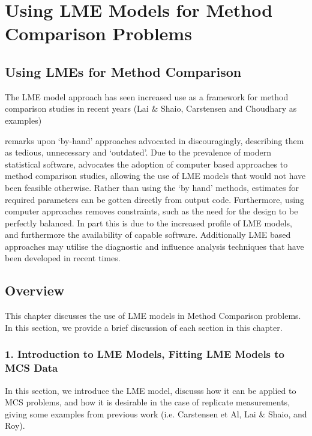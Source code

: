 \documentclass[Main.tex]{subfiles}
\begin{document}
\setcounter{tocdepth}{1}
\tableofcontents
\chapter{Using LME Models for Method Comparison Problems}

\newpage
\section{Using LMEs for Method Comparison}
The LME model approach has seen increased use as a framework for method comparison studies in recent years (Lai $\&$ Shaio, Carstensen and Choudhary as examples)

\citet{BXC2008} remarks upon `by-hand' approaches advocated in \citet{BA99} discouragingly, describing them as tedious, unnecessary and `outdated'. Due to the prevalence of modern statistical software, \citet{BXC2008} advocates the adoption of computer based approaches to method comparison studies, allowing the use of LME models that would not have been feasible otherwise. Rather than using the `by hand' methods, estimates for required parameters can be gotten directly from output code. Furthermore, using computer approaches removes constraints, such as the need for the design to be perfectly balanced.
In part this is due to the increased profile of LME models, and furthermore the availability of capable software. Additionally LME based approaches may utilise the diagnostic and influence analysis techniques that have been developed in recent times.

\section{Overview}
This chapter discusses the use of LME models in Method Comparison problems. 
In this section, we provide a brief discussion of each section in this chapter.


\subsection*{1. Introduction to LME Models, Fitting LME Models to MCS Data}

In this section, we introduce the LME model, discusss how it can be applied to MCS problems, and how it is desirable in the case of replicate measurements, giving some examples from previous work (i.e. Carstensen et Al, Lai \& Shaio, and Roy).
\end{document}
